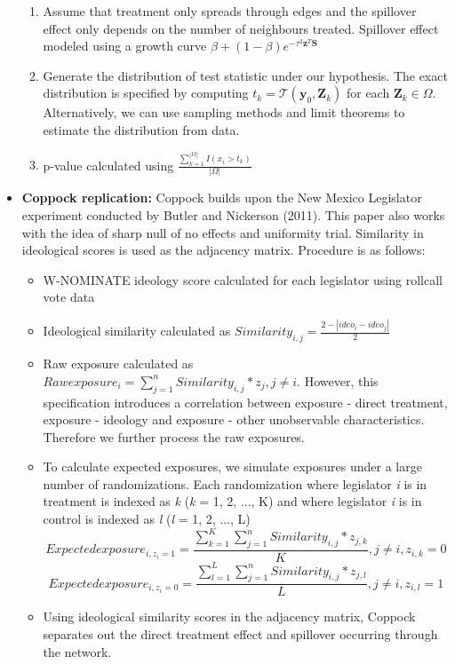 \documentclass[12pt]{article}
\begin{document}
\begin{itemize}
\begin{enumerate}
\item Assume that treatment only spreads through edges and the spillover effect only depends on the number of neighbours treated. Spillover effect modeled using a growth curve $\beta + (1-\beta)e^{-\tau^2\textbf{z}^T\textbf{S}}$

\item Generate the distribution of test statistic under our hypothesis. The exact distribution is specified by computing $t_k = \mathcal{T} (\textbf{y}_0, \textbf{Z}_k)$ for each $\textbf{Z}_k \in \Omega$. Alternatively, we can use sampling methods and limit theorems to estimate the distribution from data.

\item p-value calculated using $\frac{\sum_{k=1}^{|\Omega|} I(x_i  > t_k)}{|\Omega|}$

\end{enumerate}

\item {\bf Coppock replication:} Coppock builds upon the New Mexico Legislator experiment conducted by Butler and Nickerson (2011). This paper also works with the idea of sharp null of no effects and uniformity trial. Similarity in ideological scores is used as the adjacency matrix. Procedure is as follows:

\begin{itemize}

\item W-NOMINATE ideology score calculated for each legislator using rollcall vote data

\item Ideological similarity calculated as $Similarity_{i,j} = \frac{2 - |ideo_i - ideo_j|}{2}$

\item Raw exposure calculated as $Raw exposure_i =  \sum_{j=1}^{n}Similarity_{i,j} * z_j, j \neq i$. However, this specification introduces a correlation between exposure - direct treatment, exposure - ideology and exposure - other unobservable characteristics. Therefore we further process the raw exposures.

\item To calculate expected exposures, we simulate exposures under a large number of randomizations. Each randomization where legislator \textit{i} is in treatment is indexed as \textit{k} (\textit{k} = 1, 2, ..., K) and where legislator \textit{i} is in control is indexed as \textit{l} (\textit{l} = 1, 2, ..., L) $$Expected exposure_{i, z_i=1} =  \frac{\sum_{k=1}^{K}\sum_{j=1}^{n}Similarity_{i,j} * z_{j,k}}{K}, j \neq i, z_{i,k}=0$$ $$Expected exposure_{i, z_i=0} =  \frac{\sum_{l=1}^{L}\sum_{j=1}^{n}Similarity_{i,j} * z_{j,l}}{L}, j \neq i, z_{i,l}=1$$

\item Using ideological similarity scores in the adjacency matrix, Coppock separates out the direct treatment effect and spillover occurring through the network.

\end{itemize}
\end{itemize}
\end{document}
